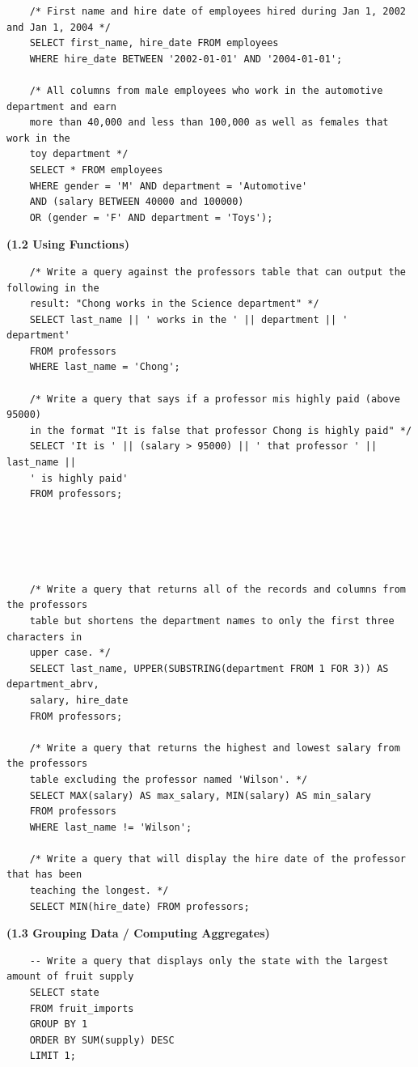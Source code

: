 \documentclass[11pt, a4paper]{article}
\begin{document}
\begin{spacing}{1.1}
\begin{lstlisting}
	/* First name and hire date of employees hired during Jan 1, 2002 and Jan 1, 2004 */
	SELECT first_name, hire_date FROM employees
	WHERE hire_date BETWEEN '2002-01-01' AND '2004-01-01';
	
	/* All columns from male employees who work in the automotive department and earn 
	more than 40,000 and less than 100,000 as well as females that work in the 
	toy department */
	SELECT * FROM employees
	WHERE gender = 'M' AND department = 'Automotive' 
	AND (salary BETWEEN 40000 and 100000) 
	OR (gender = 'F' AND department = 'Toys'); \end{lstlisting} \vspace*{5mm}
	\large \textbf{(1.2 Using Functions)} \normalsize
	\begin{lstlisting}
	/* Write a query against the professors table that can output the following in the 
	result: "Chong works in the Science department" */
	SELECT last_name || ' works in the ' || department || ' department'
	FROM professors
	WHERE last_name = 'Chong';
	
	/* Write a query that says if a professor mis highly paid (above 95000)
	in the format "It is false that professor Chong is highly paid" */
	SELECT 'It is ' || (salary > 95000) || ' that professor ' || last_name || 
	' is highly paid'
	FROM professors;
	
	
	
	
	
	/* Write a query that returns all of the records and columns from the professors 
	table but shortens the department names to only the first three characters in 
	upper case. */
	SELECT last_name, UPPER(SUBSTRING(department FROM 1 FOR 3)) AS department_abrv, 
	salary, hire_date
	FROM professors;
	
	/* Write a query that returns the highest and lowest salary from the professors 
	table excluding the professor named 'Wilson'. */
	SELECT MAX(salary) AS max_salary, MIN(salary) AS min_salary
	FROM professors
	WHERE last_name != 'Wilson';
	
	/* Write a query that will display the hire date of the professor that has been 
	teaching the longest. */
	SELECT MIN(hire_date) FROM professors; \end{lstlisting} \vspace*{5mm}
	\noindent \large \textbf{(1.3 Grouping Data / Computing Aggregates)} \normalsize
	\begin{lstlisting}
	-- Write a query that displays only the state with the largest amount of fruit supply
	SELECT state
	FROM fruit_imports
	GROUP BY 1
	ORDER BY SUM(supply) DESC
	LIMIT 1;
	

\end{lstlisting}
\end{spacing}
\end{document}
